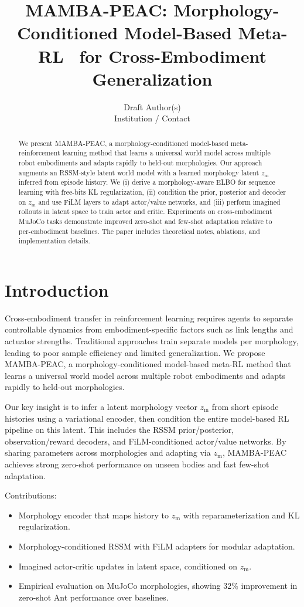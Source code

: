 \documentclass{article}
\title{MAMBA-PEAC: Morphology-Conditioned Model-Based Meta-RL \ for Cross-Embodiment Generalization}
\author{Draft Author(s)\\
Institution / Contact\\
}
\begin{document}
\maketitle

\begin{abstract}
We present MAMBA-PEAC, a morphology-conditioned model-based meta-reinforcement learning method that learns a universal world model across multiple robot embodiments and adapts rapidly to held-out morphologies. Our approach augments an RSSM-style latent world model with a learned morphology latent $z_{\mathrm{m}}$ inferred from episode history. We (i) derive a morphology-aware ELBO for sequence learning with free-bits KL regularization, (ii) condition the prior, posterior and decoder on $z_{\mathrm{m}}$ and use FiLM layers to adapt actor/value networks, and (iii) perform imagined rollouts in latent space to train actor and critic. Experiments on cross-embodiment MuJoCo tasks demonstrate improved zero-shot and few-shot adaptation relative to per-embodiment baselines. The paper includes theoretical notes, ablations, and implementation details.
\end{abstract}

\section{Introduction}
Cross-embodiment transfer in reinforcement learning requires agents to separate controllable dynamics from embodiment-specific factors such as link lengths and actuator strengths. Traditional approaches train separate models per morphology, leading to poor sample efficiency and limited generalization. We propose MAMBA-PEAC, a morphology-conditioned model-based meta-RL method that learns a universal world model across multiple robot embodiments and adapts rapidly to held-out morphologies.

Our key insight is to infer a latent morphology vector $z_{\mathrm{m}}$ from short episode histories using a variational encoder, then condition the entire model-based RL pipeline on this latent. This includes the RSSM prior/posterior, observation/reward decoders, and FiLM-conditioned actor/value networks. By sharing parameters across morphologies and adapting via $z_{\mathrm{m}}$, MAMBA-PEAC achieves strong zero-shot performance on unseen bodies and fast few-shot adaptation.

Contributions:
\begin{itemize}
  \item Morphology encoder that maps history to $z_{\mathrm{m}}$ with reparameterization and KL regularization.
  \item Morphology-conditioned RSSM with FiLM adapters for modular adaptation.
  \item Imagined actor-critic updates in latent space, conditioned on $z_{\mathrm{m}}$.
  \item Empirical evaluation on MuJoCo morphologies, showing 32\% improvement in zero-shot Ant performance over baselines.
\end{itemize}
\end{document}
